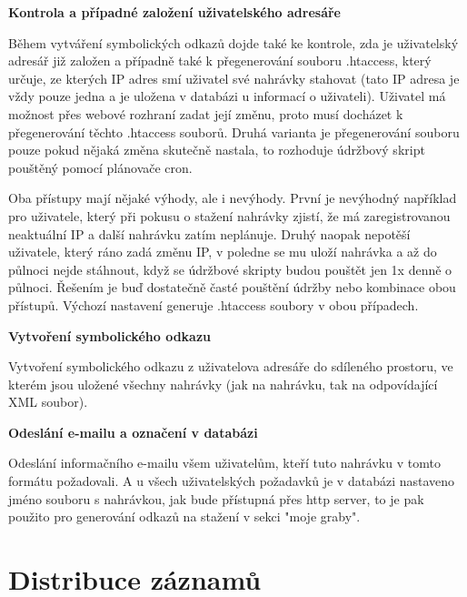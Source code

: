 \textbf{Kontrola a případné založení uživatelského adresáře}

Během vytváření symbolických odkazů dojde také ke kontrole, zda je uživatelský adresář již založen a případně také k přegenerování souboru .htaccess, který určuje, ze kterých IP adres smí uživatel své nahrávky stahovat (tato IP adresa je vždy pouze jedna a je uložena v databázi u informací o uživateli). Uživatel má možnost přes webové rozhraní zadat její změnu, proto musí docházet k přegenerování těchto .htaccess souborů. Druhá varianta je přegenerování souboru pouze pokud nějaká změna skutečně nastala, to rozhoduje údržbový skript pouštěný pomocí plánovače cron. 

\vspace{10pt}

Oba přístupy mají nějaké výhody, ale i nevýhody. První je nevýhodný například pro uživatele, který při pokusu o stažení nahrávky zjistí, že má zaregistrovanou neaktuální IP a další nahrávku zatím neplánuje. Druhý naopak nepotěší uživatele, který ráno zadá změnu IP, v poledne se mu uloží nahrávka a až do půlnoci nejde stáhnout, když se údržbové skripty budou pouštět jen 1x denně o půlnoci. Řešením je buď dostatečně časté pouštění údržby nebo kombinace obou přístupů. Výchozí nastavení generuje .htaccess soubory v obou případech.

\vspace{10pt}

\textbf{Vytvoření symbolického odkazu}

Vytvoření symbolického odkazu z uživatelova adresáře do sdíleného prostoru, ve kterém jsou uložené všechny nahrávky (jak na nahrávku, tak na odpovídající XML soubor).

\vspace{10pt}

\textbf{Odeslání e-mailu a označení v databázi}

Odeslání informačního e-mailu všem uživatelům, kteří tuto nahrávku v tomto formátu požadovali. A u všech uživatelských požadavků je v databázi nastaveno jméno souboru s nahrávkou, jak bude přístupná přes http server, to je pak použito pro generování odkazů na stažení v sekci "moje graby".

\vspace{10pt}

\section{Distribuce záznamů}


